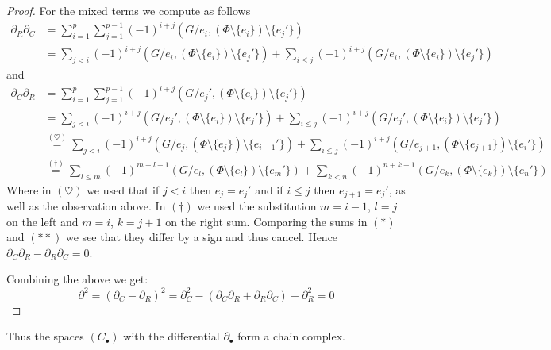 \begin{proof}
	For the mixed terms we compute as follows
	\begin{align*}
		\partial_{R} \partial_{C} &=  \sum_{i=1}^{p} \sum_{j=1}^{p-1} (-1)^{i+j}(G / e_{i}, (\Phi \setminus \{e_{i}\} ) \setminus \{e_{j}'\})  \\
					   &= \sum_{j < i} (-1)^{i+j} (G / e_{i}, (\Phi \setminus \{e_{i}\} ) \setminus \{e_{j}'\}) + \sum_{i \leq j} (-1)^{i+j}
					   (G / e_{i}, (\Phi \setminus \{e_{i}\} ) \setminus \{e_{j}'\}) \tag{$*$}
	\end{align*}
	and
	\begin{align*}
		\partial_{C} \partial_{R} &=  \sum_{i=1}^{p} \sum_{j=1}^{p-1} (-1)^{i+j}(G / e_{j}', (\Phi \setminus \{e_{i}\} ) \setminus \{e_{j}'\})  \\
					   &= \sum_{j < i} (-1)^{i+j} (G / e_{j}', (\Phi \setminus \{e_{i}\} ) \setminus \{e_{j}'\}) + \sum_{i \leq j} (-1)^{i+j}
					   (G / e_{j}', (\Phi \setminus \{e_{i}\} ) \setminus \{e_{j}'\}) \\
					   &\stackrel{(\heartsuit)}{=} \sum_{j < i} (-1)^{i+j} (G / e_{j}, (\Phi \setminus \{e_{j}\} ) \setminus \{e_{i-1}'\}) + \sum_{i \leq j} (-1)^{i+j}
					   (G / e_{j+1}, (\Phi \setminus \{e_{j+1}\} ) \setminus \{e_{i}'\}) \\
					   &\stackrel{(\dagger)}{=} \sum_{l \leq m} (-1)^{m+l+1} (G / e_{l}, (\Phi \setminus \{e_{l}\} ) \setminus \{e_{m}'\}) + \sum_{k < n} (-1)^{n+k-1}
					   (G / e_{k}, (\Phi \setminus \{e_{k}\} ) \setminus \{e_{n}'\}) \tag{$* *$}
	\end{align*}
	Where in $(\heartsuit)$ we used that if $j < i$ then $e_{j} = e_{j}'$ and if $i \leq j$ then $e_{j+1} = e_{j}'$, as well as the observation above.
	In $(\dagger)$ we used the substitution  $m = i-1$,  $l = j$ on the left and  $m = i$,  $k = j+1$ on the right sum.
	Comparing the sums in $(*)$ and $(* *)$ we see that they differ by a sign and thus cancel. Hence  $\partial_{C} \partial_{R} - \partial_{R} \partial_{C} = 0$.

	Combining the above we get:
	\[
		\partial^2 = (\partial_{C} - \partial_{R})^2 = \partial_{C}^2 - (\partial_{C} \partial_{R} + \partial_{R} \partial_{C}) + \partial_{R}^2 = 0
	\]
\end{proof}

Thus the spaces $(C_{\bullet})$ with the differential $\partial_{\bullet}$ form a chain complex.

